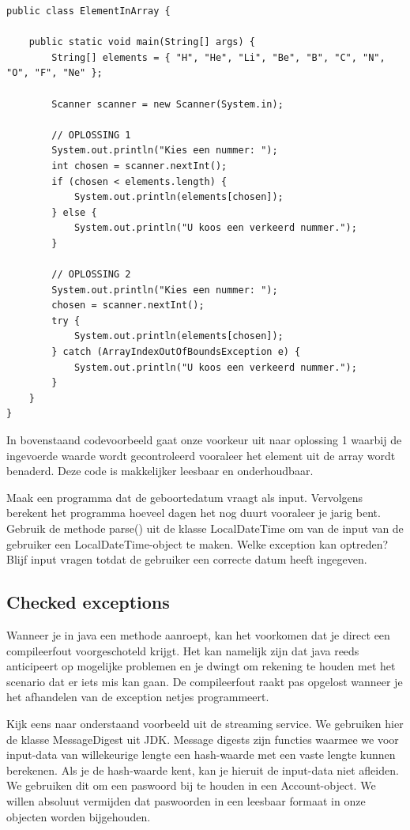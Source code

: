 \begin{lstlisting}
public class ElementInArray {

	public static void main(String[] args) {
		String[] elements = { "H", "He", "Li", "Be", "B", "C", "N", "O", "F", "Ne" };

		Scanner scanner = new Scanner(System.in);
		
		// OPLOSSING 1
		System.out.println("Kies een nummer: ");
		int chosen = scanner.nextInt();
		if (chosen < elements.length) {
			System.out.println(elements[chosen]);
		} else {
			System.out.println("U koos een verkeerd nummer.");
		}

	    // OPLOSSING 2
		System.out.println("Kies een nummer: ");
		chosen = scanner.nextInt();
		try {
			System.out.println(elements[chosen]);
		} catch (ArrayIndexOutOfBoundsException e) {
			System.out.println("U koos een verkeerd nummer.");
		}
	}
}
\end{lstlisting}

In bovenstaand codevoorbeeld gaat onze voorkeur uit naar oplossing 1 waarbij de ingevoerde waarde wordt gecontroleerd vooraleer het element uit de array wordt benaderd. Deze code is makkelijker leesbaar en onderhoudbaar.

\begin{oefening}
Maak een programma dat de geboortedatum vraagt als input. Vervolgens berekent het programma hoeveel dagen het nog duurt vooraleer je jarig bent. Gebruik de methode parse() uit de klasse LocalDateTime om van de input van de gebruiker een LocalDateTime-object te maken. Welke exception kan optreden? Blijf input vragen totdat de gebruiker een correcte datum heeft ingegeven.
\end{oefening}


\subsection{Checked exceptions}

Wanneer je in java een methode aanroept, kan het voorkomen dat je direct een compileerfout voorgeschoteld krijgt. Het kan namelijk zijn dat java reeds anticipeert op mogelijke problemen en je dwingt om rekening te houden met het scenario dat er iets mis kan gaan. De compileerfout raakt pas opgelost wanneer je het afhandelen van de exception netjes programmeert.

Kijk eens naar onderstaand voorbeeld uit de streaming service.
We gebruiken hier de klasse MessageDigest uit JDK. Message digests zijn functies waarmee we voor input-data van willekeurige lengte een hash-waarde met een vaste lengte kunnen berekenen.  Als je de hash-waarde kent, kan je hieruit de input-data niet afleiden. We gebruiken dit om een paswoord bij te houden in een Account-object. We willen absoluut vermijden dat paswoorden in een leesbaar formaat in onze objecten worden bijgehouden.

